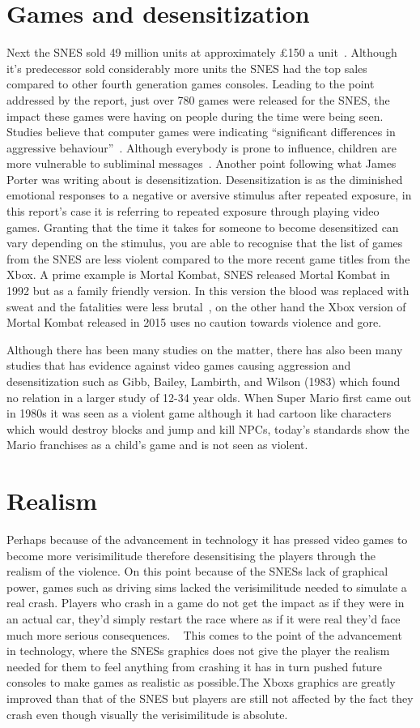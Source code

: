 \documentclass{scrartcl}
\begin{document}
	\section{Games and desensitization}
	Next the SNES sold 49 million units at approximately £150 a unit~\cite{2}. Although it's predecessor sold considerably more units the SNES had the top sales compared to other fourth generation games consoles. Leading to the point addressed by the report, just over 780 games were released for the SNES, the impact these games were having on people during the time were being seen. Studies believe that computer games were indicating “significant differences in aggressive behaviour”~\cite{3}. Although everybody is prone to influence, children are more vulnerable to subliminal messages~\cite{6}. Another point following what James Porter was writing about is desensitization. Desensitization is as the diminished emotional responses to a negative or aversive stimulus after repeated exposure, in this report's case it is referring to repeated exposure through playing video games. Granting that the time it takes for someone to become desensitized can vary depending on the stimulus, you are able to recognise that the list of games from the SNES are less violent compared to the more recent game titles from the Xbox. A prime example is Mortal Kombat, SNES released Mortal Kombat in 1992 but as a family friendly version. In this version the blood was replaced with sweat and the fatalities were less brutal~\cite{8}, on the other hand the Xbox version of Mortal Kombat released in 2015 uses no caution towards violence and gore.
	
	Although there has been many studies on the matter, there has also been many studies that has evidence against video games causing aggression and desensitization such as Gibb, Bailey, Lambirth, and Wilson (1983) which found no relation in a larger study of 12-34 year olds. When Super Mario first came out in 1980s it was seen as a violent game although it had cartoon like characters which would destroy blocks and jump and kill NPCs, today's standards show the Mario franchises as a child's game and is not seen as violent.~\cite{9}
	\section{Realism}
	Perhaps because of the advancement in technology it has pressed video games to become more verisimilitude therefore desensitising the players through the realism of the violence. On this point because of the SNESs lack of graphical power, games such as driving sims lacked the verisimilitude needed to simulate a real crash. Players who crash in a game do not get the impact as if they were in an actual car, they'd simply restart the race where as if it were real they'd face much more serious consequences. ~\cite{9} This comes to the point of the advancement in technology, where the SNESs graphics does not give the player the realism needed for them to feel anything from crashing it has in turn pushed future consoles to make games as realistic as possible.The Xboxs graphics are greatly improved than that of the SNES but players are still not affected by the fact they crash even though visually the verisimilitude is absolute.~\cite{9}
	
\end{document}
